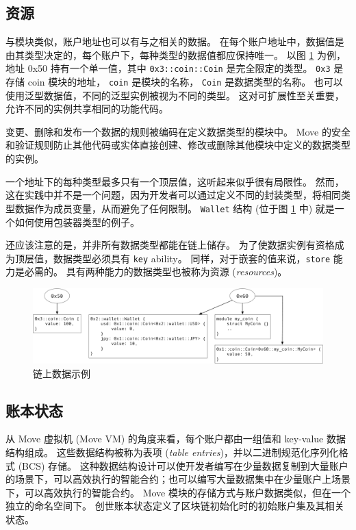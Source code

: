 \documentclass{article}
\begin{document}
\subsection{资源}
\label{subsec:resources}

与模块类似，账户地址也可以有与之相关的数据。 在每个账户地址中，数据值是由其类型决定的，每个账户下，每种类型的数据值都应保持唯一。 以图 \ref{fig:move_data} 为例， 地址 0x50 持有一个单一值，其中 \texttt{0x3::coin::Coin} 是完全限定的类型。 \texttt{0x3} 是存储 coin 模块的地址， \texttt{coin} 是模块的名称， \texttt{Coin} 是数据类型的名称。 也可以使用泛型数据值，不同的泛型实例被视为不同的类型。 这对可扩展性至关重要，允许不同的实例共享相同的功能代码。

变更、删除和发布一个数据的规则被编码在定义数据类型的模块中。 Move 的安全和验证规则防止其他代码或实体直接创建、修改或删除其他模块中定义的数据类型的实例。

一个地址下的每种类型最多只有一个顶层值，这听起来似乎很有局限性。 然而，这在实践中并不是一个问题，因为开发者可以通过定义不同的封装类型，将相同类型数据作为成员变量，从而避免了任何限制。 \texttt{Wallet} 结构 (位于图 \ref{fig:move_data} 中) 就是一个如何使用包装器类型的例子。

还应该注意的是，并非所有数据类型都能在链上储存。 为了使数据实例有资格成为顶层值，数据类型必须具有 \texttt{key} ability。 同样，对于嵌套的值来说，\texttt{store} 能力是必需的。 具有两种能力的数据类型也被称为资源 (\emph{resources})。


\begin{figure}
\centering
\includegraphics[width=1.0\textwidth]{move_2.pdf}
\caption{\label{fig:move_data}链上数据示例}
\end{figure}


\subsection{账本状态}
\label{sub:ledger_state}

从 Move 虚拟机 (Move VM) 的角度来看，每个账户都由一组值和 key-value 数据结构组成。 这些数据结构被称为表项 (\emph{table entries})，并以二进制规范化序列化格式 (BCS) 存储。 这种数据结构设计可以使开发者编写在少量数据复制到大量账户的场景下，可以高效执行的智能合约；也可以编写大量数据集中在少量账户上场景下，可以高效执行的智能合约。 Move 模块的存储方式与账户数据类似，但在一个独立的命名空间下。 创世账本状态定义了区块链初始化时的初始账户集及其相关状态。
\end{document}
